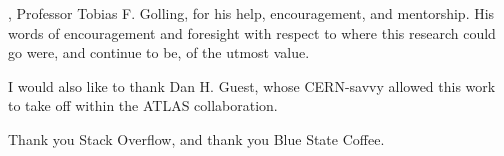 
, Professor Tobias F. Golling, for his help, encouragement, and mentorship. His words of encouragement and foresight with respect to where this research could go were, and continue to be, of the utmost value. 

I would also like to thank Dan H. Guest, whose CERN-savvy allowed this work to take off within the ATLAS collaboration.

Thank you Stack Overflow, and thank you Blue State Coffee.